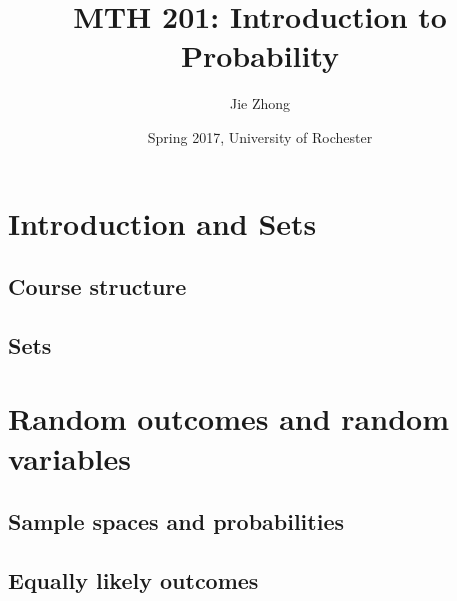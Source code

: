 


	\let\ref\Cref
	\title{\bf{MTH 201: Introduction to Probability}}
	\date{Spring 2017, University of Rochester}
	\author{Jie Zhong}



	\maketitle
	\newpage
	\tableofcontents
	\newpage


\section{Introduction and Sets} 
  \subsection{Course structure}
  \label{subsec:course}


  \subsection{Sets}
  \label{subsec:sets}



\section{Random outcomes and random variables }
\label{sec:rand-outc-rand}
  \subsection{Sample spaces and probabilities}
  \label{subsec:1.1}

  \subsection{Equally likely outcomes}
  \label{subsec:1.2}

